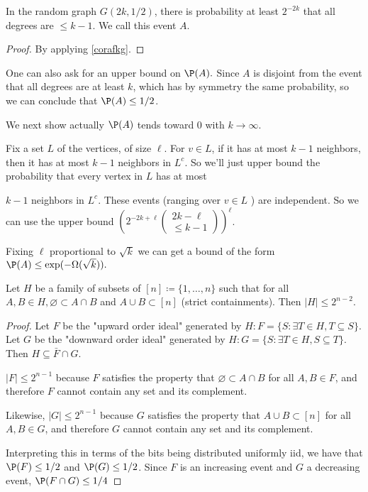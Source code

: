 \documentclass{article}
\begin{document}
\begin{exma}
In the random graph $G(2 k, 1 / 2)$, there is probability at least $2^{-2 k}$ that all degrees are $\leq k-1$. We call this event $A$. 
\begin{proof}
By applying \cref{corafkg}.
\end{proof}
\begin{rema}
One can also ask for an upper bound on $\P(A) .$ Since $A$ is disjoint from the event that all degrees are at least $k$, which has by symmetry the same probability, so we can conclude that $\P(A) \leq 1 / 2$. 

We next show actually $\P(A)$ tends toward
$0$ with $k\to \infty$. 

Fix a set $L$ of the vertices, of size $\ell$. For $v \in L$, if it has at most $k-1$ neighbors, then it has at most $k-1$ neighbors in $L^{c} .$ So we'll just upper bound the probability that every vertex in $L$ has at most

$k-1$ neighbors in $L^{c} .$ These events (ranging over $v \in L$ ) are independent. So we can use the upper bound $\left(2^{-2 k+\ell}\left(\begin{array}{c}2 k-\ell \\ \leq k-1\end{array}\right)\right)^{\ell}$. 

Fixing $\ell$ proportional to $\sqrt{k}$ we can get a bound of the form $\P(A) \leq \exp (-\Omega(\sqrt{k})) .$ 
\end{rema}

\end{exma}

\begin{exma}
 Let $H$ be a family of subsets of $[n]\coloneqq\{1,\ldots,n\}$ such that for all $A, B \in H, \varnothing \subset A \cap B$ and $A \cup B \subset[n]$ (strict containments). Then $|H| \leq 2^{n-2}$.

\begin{proof}
Let $F$ be the "upward order ideal" generated by $H: F=\{S: \exists T \in H, T \subseteq S\} .$ Let $G$ be the "downward order ideal" generated by $H: G=\{S: \exists T \in H, S \subseteq T\}$. Then $H \subseteq \bar{F} \cap G$. 

$|F| \leq 2^{n-1}$ because $F$ satisfies the property that $\varnothing \subset A \cap B$ for all $A, B \in F$, and therefore $F$ cannot contain any set and its complement.

Likewise, $|G| \leq 2^{n-1}$ because $G$ satisfies the property that $A \cup B \subset[n]$ for all $A, B \in G$, and therefore $G$ cannot contain any set and its complement.

Interpreting this in terms of the bits being distributed uniformly iid, we have that $\P(F) \leq 1 / 2$ and $\P(G) \leq 1 / 2$. Since $F$ is an increasing event and $G$ a decreasing event, $\P(F \cap G) \leq 1 / 4$
\end{proof} 
\end{exma}
\end{document}
